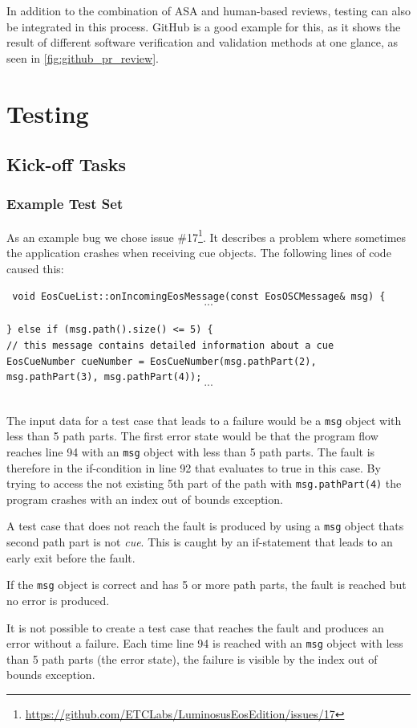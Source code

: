 \documentclass{scrreprt}
\begin{document}
In addition to the combination of ASA and human-based reviews, testing can also be integrated in this process. GitHub is a good example for this, as it shows the result of different software verification and validation methods at one glance, as seen in \vref{fig:github_pr_review}.

\chapter{Testing}

\section{Kick-off Tasks}

\subsection{Example Test Set}

As an example bug we chose issue \#17\footnote{\url{https://github.com/ETCLabs/LuminosusEosEdition/issues/17}}. It describes a problem where sometimes the application crashes when receiving cue objects. The following lines of code caused this:

\texttt{
	void EosCueList::onIncomingEosMessage(const EosOSCMessage\& msg) \{\\
		\[...\]\\
	\} else if (msg.path().size() <= 5) \{\\
// this message contains detailed information about a cue\\
EosCueNumber cueNumber = EosCueNumber(msg.pathPart(2), msg.pathPart(3), msg.pathPart(4));\\
\[...\]
}

The input data for a test case that leads to a failure would be a \texttt{msg} object with less than 5 path parts. The first error state would be that the program flow reaches line 94 with an \texttt{msg} object with less than 5 path parts. The fault is therefore in the if-condition in line 92 that evaluates to true in this case. By trying to access the not existing 5th part of the path with \texttt{msg.pathPart(4)} the program crashes with an index out of bounds exception.

A test case that does not reach the fault is produced by using a \texttt{msg} object thats second path part is not \textit{cue}. This is caught by an if-statement that leads to an early exit before the fault.

If the \texttt{msg} object is correct and has 5 or more path parts, the fault is reached but no error is produced.

It is not possible to create a test case that reaches the fault and produces an error without a failure. Each time line 94 is reached with an \texttt{msg} object with less than 5 path parts (the error state), the failure is visible by the index out of bounds exception.
\end{document}

